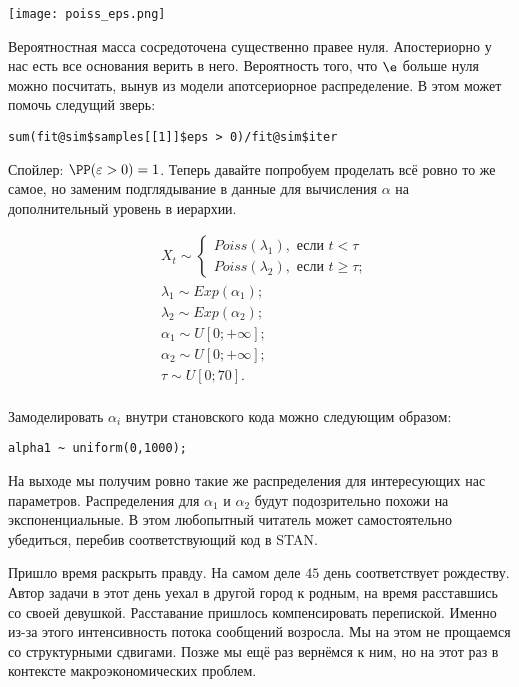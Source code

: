 \begin{center}
	\texttt{[image: poiss\_eps.png]}
\end{center}

Вероятностная масса сосредоточена существенно правее нуля. Апостериорно у нас есть все основания верить в него. Вероятность того, что $\e$ больше нуля можно посчитать, вынув из модели апотсериорное распределение. В этом может помочь следущий зверь: 

\begin{verbatim} 
sum(fit@sim$samples[[1]]$eps > 0)/fit@sim$iter
\end{verbatim}

Спойлер: $\PP(\varepsilon > 0) = 1 $. Теперь давайте попробуем проделать всё ровно то же самое, но заменим подглядывание в данные для вычисления $\alpha$ на дополнительный уровень в иерархии. 

\begin{equation*}
\begin{aligned}
& X_t \sim \begin{cases}  Poiss(\lambda_1), \text{ если } t < \tau \\  Poiss(\lambda_2), \text{ если } t \ge \tau; \end{cases}\\
&\lambda_1 \sim Exp(\alpha_1); \\
& \lambda_2 \sim Exp(\alpha_2); \\
&\alpha_1 \sim U[0;+\infty]; \\
&\alpha_2 \sim U[0;+\infty]; \\
&\tau \sim U[0;70]. \\ 
\end{aligned}
\end{equation*}


Замоделировать $\alpha_i$ внутри становского кода можно следующим образом: 

\begin{verbatim}
alpha1 ~ uniform(0,1000);
\end{verbatim}

На выходе мы получим ровно такие же распределения для интересующих нас параметров. Распределения для $\alpha_1$ и $\alpha_2$ будут подозрительно похожи на экспоненциальные. В этом любопытный читатель может самостоятельно убедиться, перебив соответствующий код в STAN. 

Пришло время раскрыть правду. На самом деле $45$ день соответствует рождеству. Автор задачи в этот день уехал в другой город к родным, на время расставшись со своей девушкой. Расставание пришлось компенсировать перепиской. Именно из-за этого интенсивность потока сообщений возросла. Мы на этом не прощаемся со структурными сдвигами. Позже мы ещё раз вернёмся к ним, но на этот раз в контексте макроэкономических проблем.  

